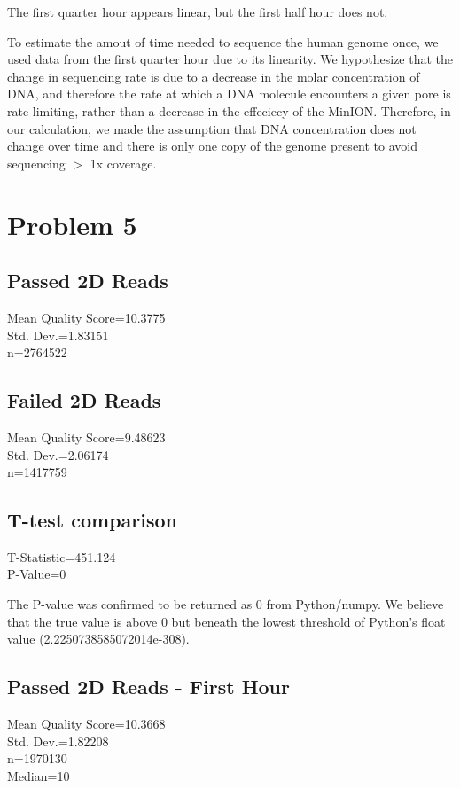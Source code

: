 \documentclass[11pt]{article}
\begin{document}
The first quarter hour appears linear, but the first half hour does not.

To estimate the amout of time needed to sequence the human genome once, 
we used data from the first quarter hour due to its linearity.  We hypothesize 
that the change in sequencing rate is due to a decrease in the molar concentration 
of DNA, and therefore the rate at which a DNA molecule encounters a given pore is 
rate-limiting, rather than a decrease in the effeciecy of the MinION.  Therefore, 
in our calculation, we made the assumption that DNA concentration does not change 
over time and there is only one copy of the genome present to avoid sequencing 
$>$ 1x coverage. 

\section*{Problem 5}
\subsection*{Passed 2D Reads}
Mean Quality Score=10.3775\\  Std. Dev.=1.83151\\ n=2764522\\

\subsection*{Failed 2D Reads}
Mean Quality Score=9.48623\\  Std. Dev.=2.06174\\ n=1417759\\

\subsection*{T-test comparison}
T-Statistic=451.124\\
P-Value=0


The P-value was confirmed to be returned as 0 from Python/numpy.
We believe that the true value is above 0 but beneath the lowest threshold of Python's float value (2.2250738585072014e-308).

\subsection*{Passed 2D Reads - First Hour}
Mean Quality Score=10.3668\\  Std. Dev.=1.82208\\ n=1970130\\
Median=10
\end{document}
